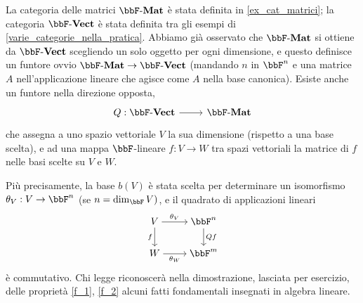 \begin{example}
	La categoria delle matrici \(\ctMat\) è stata definita in \ref{ex_cat_matrici}; la categoria \(\ctVect\) è stata definita tra gli esempi di \ref{varie_categorie_nella_pratica}. Abbiamo già osservato che \(\ctMat\) si ottiene da \(\ctVect\) scegliendo un solo oggetto per ogni dimensione, e questo definisce un funtore ovvio \(\ctMat \to \ctVect\) (mandando \(n\) in \(\bbF^n\) e una matrice \(A\) nell'applicazione lineare che agisce come \(A\) nella base canonica). Esiste anche un funtore nella direzione opposta,
	\[\dmFun{Q}{\ctVect}{\ctMat}\]
	che assegna a uno spazio vettoriale \(V\) la sua dimensione (rispetto a una base scelta), e ad una mappa \(\bbF\)-lineare \(f : V\to W\) tra spazi vettoriali la matrice di \(f\) nelle basi scelte su \(V\) e \(W\).

	Più precisamente, la base \(b(V)\) è stata scelta per determinare un isomorfismo \(\theta_V : V \to \bbF^n\) (se \(n=\dim_\bbF V)\), e il quadrato di applicazioni lineari
	\[\begin{tikzcd}[cramped]
			V & {\bbF^n} \\
			W & {\bbF^m}
			\arrow["{\theta_V}", from=1-1, to=1-2]
			\arrow["f"', from=1-1, to=2-1]
			\arrow["Qf", from=1-2, to=2-2]
			\arrow["{\theta_W}"', from=2-1, to=2-2]
		\end{tikzcd}\]
	è commutativo. Chi legge riconoscerà nella dimostrazione, lasciata per esercizio, delle proprietà \ref{f_1}, \ref{f_2} alcuni fatti fondamentali insegnati in algebra lineare.
\end{example}
